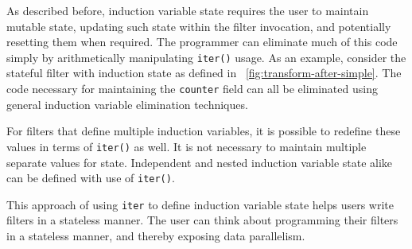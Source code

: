 As described before, induction variable state requires the user to maintain mutable state, updating such state within the filter invocation, and potentially resetting them when required. The programmer can eliminate much of this code simply by arithmetically manipulating {\tt iter()} usage.  As an example, consider the stateful filter with induction state as defined in ~\ref{fig:transform-after-simple}.  The code necessary for maintaining the {\tt counter} field can all be eliminated using general induction variable elimination techniques.  

For filters that define multiple induction variables, it is possible to redefine these values in terms of {\tt iter()} as well.  It is not necessary to maintain multiple separate values for state.  Independent and nested induction variable state alike can be defined with use of {\tt iter()}.

This approach of using {\tt iter} to define induction variable state helps users write filters in a stateless manner.  The user can think about programming their filters in a stateless manner, and thereby exposing data parallelism. 


